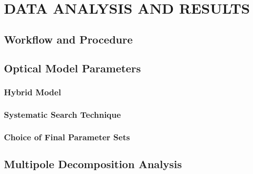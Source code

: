 %
%

\chapter{DATA ANALYSIS AND RESULTS}
\label{chp:analysis}

\section{Workflow and Procedure}
\label{sec:analysis-workflow}

\section{Optical Model Parameters}
\label{sec:analysis-omp}
\subsection{Hybrid Model}
\label{ssec:analysis-omp-hybrid}
\subsection{Systematic Search Technique}
\label{ssec:analysis-omp-search-tech}
\subsection{Choice of Final Parameter Sets}
\label{ssec:analysis-omp-final-omp-choice}

\section{Multipole Decomposition Analysis}
\label{sec:analysis-mda}